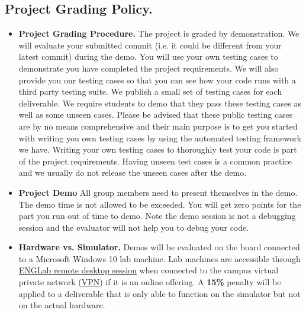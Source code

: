 \subsection*{Project Grading Policy.} 

\begin{itemize}
    \item {\bf Project Grading Procedure.}
        The project is graded by demonstration. We will evaluate your submitted commit (i.e. it could be different from your latest commit) during the demo. You will use your own testing cases to demonstrate you have completed the project requirements. We will also provide you our testing cases so that you can see how your code runs with a third party testing suite. We publish a small set of testing cases for each deliverable. We require students to demo that they pass these testing cases as well as some unseen cases. Please be advised that these public testing cases are by no means comprehensive and their main purpose is to get you started with writing you own testing cases by using the automated testing framework we have.  Writing your own testing cases to thoroughly test your code is part of the project requirements. Having unseen test cases is a common practice and we usually do not release the unseen cases after the demo. %
    \item {\bf Project Demo}
        All group members need to present themselves in the demo. The demo time is not allowed to be exceeded. You will get zero points for the part you run out of time to demo. Note the demo session is not a debugging session and the evaluator will not help you to debug your code. 
    \item {\bf Hardware vs. Simulator.}
        Demos will be evaluated on the board connected to a Microsoft Windows 10 lab machine. Lab machines are accessible through \href{https://englab.uwaterloo.ca/}{ENGLab remote desktop session} when connected to the campus virtual private network (\href{https://uwaterloo.ca/information-systems-technology/services/virtual-private-network-vpn}{VPN}) if it is an online offering. A {\bf15\%} penalty will be applied to a deliverable that is only able to function on the simulator but not on the actual hardware.

\end{itemize}
